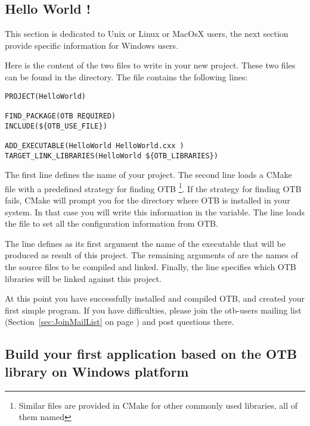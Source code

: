 \subsection{Hello World !}
\label{sec:HelloWorldOTB}

This section is dedicated to Unix or Linux or MacOsX users, the next section provide specific information for Windows users.


Here is the content of the two files to write in your new project. These two files can be found in the  directory. The  file contains the following lines:

\small
\begin{verbatim}
PROJECT(HelloWorld)

FIND_PACKAGE(OTB REQUIRED)
INCLUDE(${OTB_USE_FILE})

ADD_EXECUTABLE(HelloWorld HelloWorld.cxx )
TARGET_LINK_LIBRARIES(HelloWorld ${OTB_LIBRARIES})
\end{verbatim}

\normalsize

The first line defines the name of your project. The second line loads a CMake file with a predefined strategy for finding OTB \footnote{Similar files are provided in CMake for other commonly used libraries, all of them named }. If the strategy for finding OTB fails, CMake will prompt you for the directory where OTB is installed in your system. In that case you will write this information in the  variable. The line  loads the  file to set all the configuration information from OTB.

The line  defines as its first argument the name of the executable that will be produced as result of this project. The remaining arguments of  are the names of the source files to be compiled and linked.  Finally, the  line specifies which OTB libraries will be linked against this project.



At this point you have successfully installed and compiled OTB, and created your first simple program. If you have difficulties, please join the otb-users mailing list (Section~\ref{sec:JoinMailList} on page \pageref{sec:JoinMailList}) and post questions there.


\subsection{Build your first application based on the OTB library on Windows platform}
\label{sec:FirstWinAppOTB}

